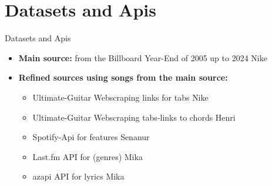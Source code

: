     \section{Datasets and Apis}
    \begin{frame}{Datasets and Apis}
        \begin{itemize}
            \item \textbf{Main source:}  from the Billboard Year-End of 2005 up to 2024 \alert{Nike}
            \item \textbf{Refined sources using songs from the main source:}
                \begin{itemize}
                    \item Ultimate-Guitar Webscraping links for tabs \alert{Nike}
                    \item Ultimate-Guitar Webscraping tabs-links to chords \alert{Henri}
                    \item Spotify-Api for features \alert{Senanur}
                    \item Last.fm API for  (genres) \alert{Mika}
                    \item azapi API for lyrics \alert{Mika}
                \end{itemize}
        \end{itemize}
    \end{frame}

